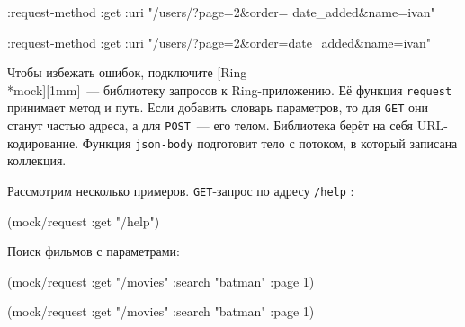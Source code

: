 \begin{english}
  \begin{clojure}
{:request-method :get
 :uri
 "/users/?page=2&order=
                 date_added&name=ivan"}
  \end{clojure}
\end{english}

\else

\begin{english}
  \begin{clojure}
{:request-method :get
 :uri "/users/?page=2&order=date_added&name=ivan"}
  \end{clojure}
\end{english}

\fi


Чтобы избежать ошибок, подключите
[Ring\\*mock][1mm]~---
библиотеку запросов к Ring-при\-ло\-же\-нию. Её функция \verb|request| принимает
метод и путь. Если добавить словарь параметров, то для \verb|GET| они станут
частью адреса, а для \verb|POST|~--- его телом. Библиотека берёт на себя
URL-кодирование. Функция \verb|json-body| подготовит тело с потоком, в который
записана коллекция.

Рассмотрим несколько примеров. \verb|GET|-запрос по адресу \verb|/help| :

\begin{english}
  \begin{clojure}
(mock/request :get "/help")
  \end{clojure}
\end{english}

\noindent
Поиск фильмов с параметрами:

\ifnarrow

\begin{english}
  \begin{clojure}
(mock/request :get "/movies"
  {:search "batman" :page 1})
  \end{clojure}
\end{english}

\else

\begin{english}
  \begin{clojure}
(mock/request :get "/movies" {:search "batman" :page 1})
  \end{clojure}
\end{english}

